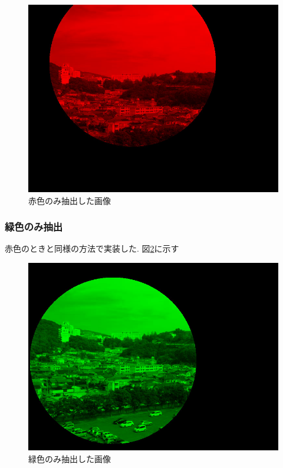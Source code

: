\documentclass[11pt]{jarticle}
\begin{document}
\begin{figure}[htbp]
    \centering
    \includegraphics[scale=.2]{1-6.jpg}
    \caption{赤色のみ抽出した画像}
    \label{1-6.jpg}
\end{figure}

\subsubsection{緑色のみ抽出}
赤色のときと同様の方法で実装した.
図\ref{1-7.jpg}に示す

\begin{figure}[htbp]
    \centering
    \includegraphics[scale=.2]{1-7.jpg}
    \caption{緑色のみ抽出した画像}
    \label{1-7.jpg}
\end{figure}
\end{document}
